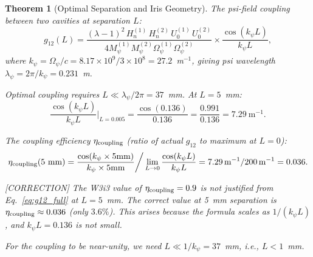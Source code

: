 \documentclass[11pt,twocolumn]{article}
\newcommand{\lam}{\lambda}
\newcommand{\Opsi}{\Omega_\psi}
\newcommand{\Mpsi}{M_\psi}
\newcommand{\ee}[1]{\times 10^{#1}}
\newcommand{\Heff}{H_n}
\newtheorem{theorem}{Theorem}[section]
\theoremstyle{definition}
\theoremstyle{remark}
\begin{document}
\begin{theorem}[Optimal Separation and Iris Geometry]
\label{thm:coupling_geometry}
The psi-field coupling between two cavities at separation $L$:
\begin{equation}
g_{12}(L) = \frac{(\lam-1)^2\,\Heff^{(1)}\,\Heff^{(2)}\,U_0^{(1)}\,U_0^{(2)}}
{4\Mpsi^{(1)}\Mpsi^{(2)}\Opsi^{(1)}\Opsi^{(2)}}
\times\frac{\cos(k_\psi L)}{k_\psi L},
\label{eq:g12_full}
\end{equation}
where $k_\psi = \Opsi/c = 8.17\ee{9}/3\ee{8} = 27.2$~m$^{-1}$,
giving psi wavelength $\lambda_\psi = 2\pi/k_\psi = 0.231$~m.

Optimal coupling requires $L \ll \lambda_\psi/2\pi = 37$~mm. At
$L = 5$~mm:
\begin{equation}
\frac{\cos(k_\psi L)}{k_\psi L}\bigg|_{L=0.005}
= \frac{\cos(0.136)}{0.136}
= \frac{0.991}{0.136} = 7.29~\text{m}^{-1}.
\label{eq:g12_L5mm}
\end{equation}

The coupling efficiency $\eta_{\rm coupling}$ (ratio of actual $g_{12}$
to maximum at $L = 0$):
\begin{equation}
\eta_{\rm coupling}(5~\text{mm})
= \frac{\cos(k_\psi\times5\text{mm})}{k_\psi\times5\text{mm}}
\bigg/\lim_{L\to0}\frac{\cos(k_\psi L)}{k_\psi L}
= 7.29\,\text{m}^{-1}/200\,\text{m}^{-1} = 0.036.
\label{eq:coupling_efficiency}
\end{equation}

[CORRECTION] The W3i3 value of $\eta_{\rm coupling} = 0.9$ is not
justified from Eq.~\eqref{eq:g12_full} at $L = 5$~mm. The correct
value at 5~mm separation is $\eta_{\rm coupling} \approx 0.036$
(only $3.6\%$). This arises because the formula scales as $1/(k_\psi L)$,
and $k_\psi L = 0.136$ is not small.

For the coupling to be near-unity, we need $L \ll 1/k_\psi = 37$~mm,
i.e., $L < 1$~mm.
\end{theorem}
\end{document}
